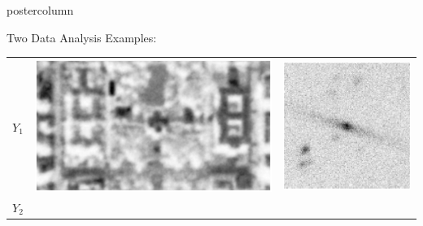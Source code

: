 \documentclass[final]{beamer}
\begin{document}
\begin{frame}
\begin{columns}
\begin{column}{.32\textwidth}
\begin{beamercolorbox}[center,wd=\textwidth]{postercolumn}
\begin{minipage}[T]{.95\textwidth}
{\begin{block}{Two Data Analysis Examples: }
\begin{table}
\begin{tabular}{c c c}
                  \begin{minipage}[r][2.5in][c]{3cm}
                    $Y_1$
                  \end{minipage} &
                  \begin{minipage}[c][2.5in][c]{6in}
                    \includegraphics[width=5in,trim=80 130 80 90,clip]{./figures/satelliteAvg1.eps}
                  \end{minipage} &
                  \begin{minipage}[c][2.5in][c]{5in}
                    \includegraphics[width=2.7in,trim = 120 50 120 50,clip]{./figures/galaxyPic0.eps}
                  \end{minipage} 
                  \\
                  \begin{minipage}[c][2.5in][c]{3cm}
                    $Y_2$
                  \end{minipage} &
                  \begin{minipage}[c][2.5in][c]{6in}

\end{minipage}
\end{tabular}
\end{table}
\end{block}}
\end{minipage}
\end{beamercolorbox}
\end{column}
\end{columns}
\end{frame}
\end{document}
